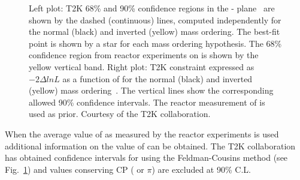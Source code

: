 \begin{figure}[htbp]
\begin{minipage}{.46\linewidth}
   \end{minipage}
    \caption{Left plot: T2K 68\% and 90\%  confidence regions in the \dcp - \sto plane~\cite{t2k2016} are shown by the dashed
(continuous) lines, computed independently for the normal
(black) and inverted (yellow) mass ordering. The best-fit point
is shown by a star for each mass ordering hypothesis. The
68\% confidence region from reactor experiments on \sto is
shown by the yellow vertical band. 
Right plot: T2K constraint expressed as $-2\Delta ln L$ as a function of \dcp for the normal (black)
and inverted (yellow) mass ordering~\cite{t2k2016}. The vertical lines show the
corresponding allowed 90\% confidence intervals. The reactor measurement of   \sto is used as prior. Courtesy of the T2K collaboration.
}
 \label{fig:t2kjoint}
\end{figure}


%


When the average value of \thint as measured by the reactor experiments is used additional information on the value of \dcp can be obtained. The T2K collaboration has obtained confidence intervals for \dcp using the Feldman-Cousins method (see Fig.~\ref{fig:t2kjoint}) and values conserving CP ( or $\pi$) are excluded at 90\% C.L.


